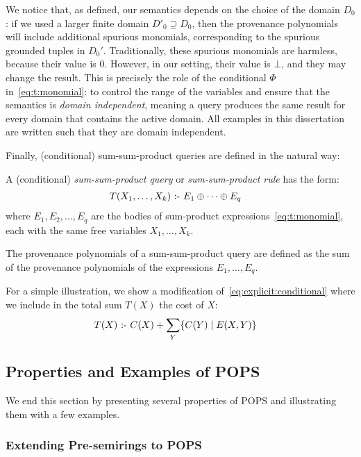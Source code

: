 We notice that, as defined, our semantics depends on the choice of the
domain $D_0$: if we used a larger finite domain $D'_0 \supseteq D_0$,
then the provenance polynomials will include additional spurious
monomials, corresponding to the spurious grounded tuples in $D_0'$.
Traditionally, these spurious monomials are harmless, because their
value is 0.  However, in our setting, their value is $\bot$, and they
may change the result.  This is precisely the role of the conditional
$\Phi$ in~\eqref{eq:t:monomial}: to control the range of the variables
and ensure that the semantics is {\em domain independent},
 meaning a query produces the same result for every domain 
 that contains the active domain.
  All examples in
this dissertation are written such that they are domain independent.

Finally, (conditional) sum-sum-product queries are defined in the natural way:

\begin{defn} \label{def:sum:sum:product}
    A (conditional) {\em sum-sum-product query} or {\em sum-sum-product rule} has the
  form:
%
\begin{align}
  T(X_1, \ldots, X_k) &\text{ :- } E_1 \oplus \cdots \oplus E_q \label{eq:sum:sum:product}
  \end{align}
%
  where $E_1, E_2, \ldots, E_q$ are the bodies of sum-product
  expressions~\eqref{eq:t:monomial}, each with the same free variables
  $X_1, \ldots, X_k$.
\end{defn}

The provenance polynomials of a sum-sum-product query are defined as
the sum of the provenance polynomials of the expressions
$E_1, \ldots, E_q$.

For a simple illustration, we show a modification
of~\eqref{eq:explicit:conditional} where we include in the total sum
$T(X)$ the cost of $X$:
%
\begin{align*}
    T(X) \text{ :- } & C(X) + \sum_Y \{{C(Y)}\mid{E(X,Y)}\}
\end{align*}

\subsection{Properties and Examples of POPS}
\label{subsec:examples:pops}

We end this section by presenting several properties of POPS and
illustrating them  with a few examples.

\subsubsection{Extending Pre-semirings to POPS}

